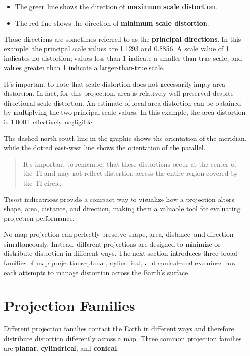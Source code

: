 \documentclass[
  letterpaper,
]{book}
\providecommand{\tightlist}{%
  \setlength{\itemsep}{0pt}\setlength{\parskip}{0pt}}
\begin{document}
\begin{itemize}
\tightlist
\item
  The green line shows the direction of \textbf{maximum scale
  distortion}.
\item
  The red line shows the direction of \textbf{minimum scale distortion}.
\end{itemize}

These directions are sometimes referred to as the \textbf{principal
directions}. In this example, the principal scale values are 1.1293 and
0.8856. A scale value of 1 indicates no distortion; values less than 1
indicate a smaller-than-true scale, and values greater than 1 indicate a
larger-than-true scale.

It's important to note that scale distortion does not necessarily imply
area distortion. In fact, for this projection, area is relatively well
preserved despite directional scale distortion. An estimate of local
area distortion can be obtained by multiplying the two principal scale
values. In this example, the area distortion is 1.0001--effectively
negligible.

The dashed north-south line in the graphic shows the orientation of the
meridian, while the dotted east-west line shows the orientation of the
parallel.

\begin{quote}
It's important to remember that these distortions occur at the center of
the TI and may not reflect distortion across the entire region covered
by the TI circle.
\end{quote}

Tissot indicatrices provide a compact way to visualize how a projection
alters shape, area, distance, and direction, making them a valuable tool
for evaluating projection performance.

No map projection can perfectly preserve shape, area, distance, and
direction simultaneously. Instead, different projections are designed to
minimize or distribute distortion in different ways. The next section
introduces three broad families of map projections--planar, cylindrical,
and conical--and examines how each attempts to manage distortion across
the Earth's surface.

\section{Projection Families}\label{projection-families}

Different projection families contact the Earth in different ways and
therefore distribute distortion differently across a map. Three common
projection families are \textbf{planar}, \textbf{cylindrical}, and
\textbf{conical}.
\end{document}
